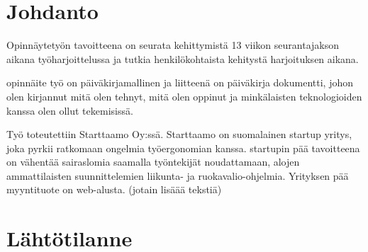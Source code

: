 \documentclass[11pt,a4paper,titlepage,oneside]{article}
\begin{document}
\newpage





\clearpage
\setcounter{page}{1}

\pagestyle{fancy}
\lfoot{}
\cfoot{}
\rfoot{}
\lhead{}
\chead{}
\rhead{\thepage}
\renewcommand{\headrulewidth}{0pt}
\renewcommand{\footrulewidth}{0pt}


\section{Johdanto}              %





Opinnäytetyön tavoitteena on seurata kehittymistä 13 viikon seurantajakson aikana työharjoittelussa 
ja tutkia henkilökohtaista kehitystä harjoituksen aikana.
\medskip


opinnäite työ on päiväkirjamallinen ja liitteenä on päiväkirja dokumentti, 
johon olen kirjannut mitä olen tehnyt, mitä olen oppinut ja minkälaisten teknologioiden kanssa olen ollut tekemisissä.
\medskip


Työ toteutettiin Starttaamo Oy:ssä. Starttaamo on suomalainen startup yritys, joka pyrkii ratkomaan ongelmia työergonomian kanssa.
startupin pää tavoitteena on vähentää sairaslomia saamalla työntekijät noudattamaan, alojen ammattilaisten suunnittelemien liikunta- ja ruokavalio-ohjelmia. 
Yrityksen pää myyntituote on web-alusta. (jotain lisäää tekstiä)
\medskip






\newpage
\section{Lähtötilanne}         %
\end{document}
